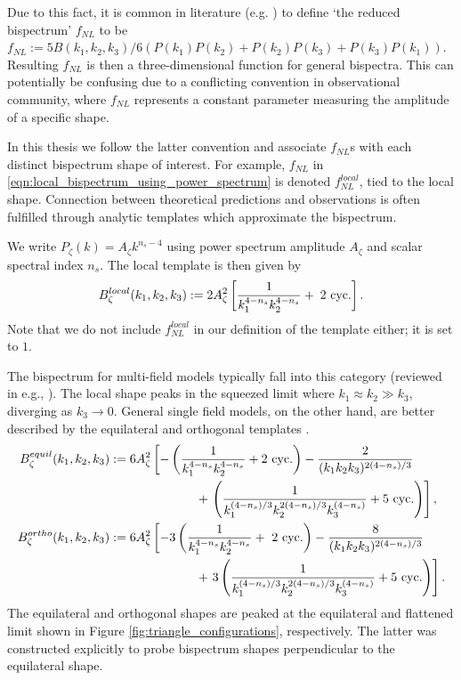Due to this fact, it is common in literature (e.g. \cite{Burrage2011large}) to define `the reduced bispectrum' $f_{NL}$ to be $f_{NL} := 5B(k_1,k_2,k_3) / 6(P(k_1)P(k_2) + P(k_2)P(k_3) + P(k_3)P(k_1))$. Resulting $f_{NL}$ is then a three-dimensional function for general bispectra. This can potentially be confusing due to a conflicting convention in observational community, where $f_{NL}$ represents a constant parameter measuring the amplitude of a specific shape.

In this thesis we follow the latter convention and associate $f_{NL}$s with each distinct bispectrum shape of interest. For example, $f_{NL}$ in \eqref{eqn:local_bispectrum_using_power_spectrum} is denoted $f_{NL}^{local}$, tied to the local shape. Connection between theoretical predictions and observations is often fulfilled through analytic templates which approximate the bispectrum.

We write $P_\zeta(k) = A_\zeta k^{n_s-4}$ using power spectrum amplitude $A_\zeta$ and scalar spectral index $n_s$. The local template is then given by
\begin{align}
	B_\zeta^{local} (k_1, k_2, k_3) := 2A_\zeta^2 \left[ \frac{1}{k_1^{4-n_s} k_2^{4-n_s}} + \text{\;2 cyc.} \right]. \label{def:local_template} 
\end{align}
Note that we do not include $f_{NL}^{local}$ in our definition of the template either; it is set to $1$.

The bispectrum for multi-field models typically fall into this category (reviewed in e.g., \cite{Byrnes2010review}). The local shape peaks in the squeezed limit where $k_1 \approx k_2 \gg k_3$, diverging as $k_3\rightarrow0$. General single field models, on the other hand, are better described by the equilateral and orthogonal templates \cite{Creminelli2006limits,Senatore2010orthogonal} .
\begin{align}
	B_\zeta^{equil} (k_1, k_2, k_3) &:= 6A_\zeta^2 \left[ -\left( \frac{1}{k_1^{4-n_s} k_2^{4-n_s}} + \text{2 cyc.} \right) -\frac{2}{(k_1 k_2 k_3)^{2(4-n_s)/3}} \right.\nonumber\\
	&\hspace{0.2\textwidth} + \left. \left( \frac{1}{k_1^{(4-n_s)/3} k_2^{2(4-n_s)/3} k_3^{(4-n_s)}} + \text{5 cyc.} \right) \right], \label{def:equilateral_template} \\
	B_\zeta^{ortho} (k_1, k_2, k_3) &:= 6A_\zeta^2 \left[ -3\left( \frac{1}{k_1^{4-n_s} k_2^{4-n_s}} + \text{ 2 cyc.} \right) -\frac{8}{(k_1 k_2 k_3)^{2(4-n_s)/3}} \right.\nonumber\\
	&\hspace{0.2\textwidth} + \left. 3\left( \frac{1}{k_1^{(4-n_s)/3} k_2^{2(4-n_s)/3} k_3^{(4-n_s)}} + \text{5 cyc.} \right) \right]. \label{def:orthogonal_template} 
\end{align}
The equilateral and orthogonal shapes are peaked at the equilateral and flattened limit shown in Figure \ref{fig:triangle_configurations}, respectively. The latter was constructed explicitly to probe bispectrum shapes perpendicular to the equilateral shape.

